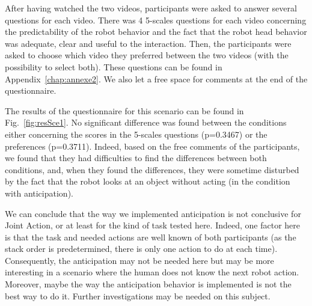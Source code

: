 \documentclass[english,a4paper,11pt,twoside]{StyleThese}
\begin{document}
After having watched the two videos, participants were asked to answer several questions for each video. There was 4 5-scales questions for each video concerning the predictability of the robot behavior and the fact that the robot head behavior was adequate, clear and useful to the interaction. Then, the participants were asked to choose which video they preferred between the two videos (with the possibility to select both). These questions can be found in Appendix~\ref{chap:annexe2}. We also let a free space for comments at the end of the questionnaire.

The results of the questionnaire for this scenario can be found in Fig.~\ref{fig:resSce1}. No significant difference was found between the conditions either concerning the scores in the 5-scales questions (p=0.3467) or the preferences (p=0.3711). Indeed, based on the free comments of the participants, we found that they had difficulties to find the differences between both conditions, and, when they found the differences, they were sometime disturbed by the fact that the robot looks at an object without acting (in the condition with anticipation). 

We can conclude that the way we implemented anticipation is not conclusive for Joint Action, or at least for the kind of task tested here. Indeed, one factor here is that the task and needed actions are well known of both participants (as the stack order is predetermined, there is only one action to do at each time). Consequently, the anticipation may not be needed here but may be more interesting in a scenario where the human does not know the next robot action. Moreover, maybe the way the anticipation behavior is implemented is not the best way to do it. Further investigations may be needed on this subject.
\end{document}
